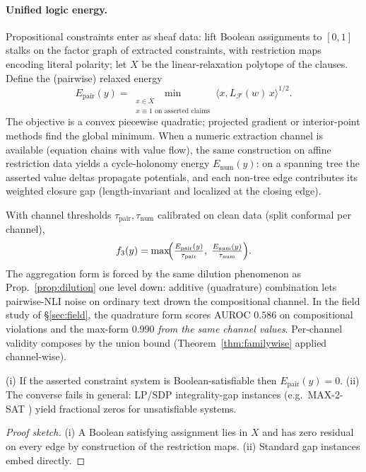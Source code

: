 \paragraph{Unified logic energy.} Propositional constraints enter as sheaf
data: lift Boolean assignments to $[0,1]$ stalks on the factor graph of
extracted constraints, with restriction maps encoding literal polarity; let
$X$ be the linear-relaxation polytope of the clauses. Define the (pairwise)
relaxed energy
\[
E_{\mathrm{pair}}(y)=\min_{\substack{x\in X\\ x\equiv 1 \text{ on asserted claims}}}
\langle x, L_{\mathcal F}(w)\, x\rangle^{1/2}.
\]
The objective is a convex piecewise quadratic; projected gradient or
interior-point methods find the global minimum. When a numeric extraction
channel is available (equation chains with value flow), the same construction
on affine restriction data yields a cycle-holonomy energy
$E_{\mathrm{num}}(y)$: on a spanning tree the asserted value deltas propagate
potentials, and each non-tree edge contributes its weighted closure gap
(length-invariant and localized at the closing edge).

\begin{definition}
\label{def:maxform}
With channel thresholds $\tau_{\mathrm{pair}},\tau_{\mathrm{num}}$ calibrated
on clean data (split conformal per channel),
\[
f_3(y)=\max\!\Bigl(\tfrac{E_{\mathrm{pair}}(y)}{\tau_{\mathrm{pair}}},\;
\tfrac{E_{\mathrm{num}}(y)}{\tau_{\mathrm{num}}}\Bigr).
\]
The aggregation form is forced by the same dilution phenomenon as
Prop.~\ref{prop:dilution} one level down: additive (quadrature) combination
lets pairwise-NLI noise on ordinary text drown the compositional channel. In
the field study of \S\ref{sec:field}, the quadrature form scores AUROC
$0.586$ on compositional violations and the max-form $0.990$ \emph{from the
same channel values}. Per-channel validity composes by the union bound
(Theorem~\ref{thm:familywise} applied channel-wise).
\end{definition}

\begin{proposition}
\label{prop:gap}
(i) If the asserted constraint system is Boolean-satisfiable then
$E_{\mathrm{pair}}(y)=0$. (ii) The converse fails in general: LP/SDP
integrality-gap instances (e.g.\ MAX-2-SAT \cite{goemans1995}) yield
fractional zeros for unsatisfiable systems.
\end{proposition}
\begin{proof}[Proof sketch]
(i) A Boolean satisfying assignment lies in $X$ and has zero residual on every
edge by construction of the restriction maps. (ii) Standard gap instances
embed directly.
\end{proof}

